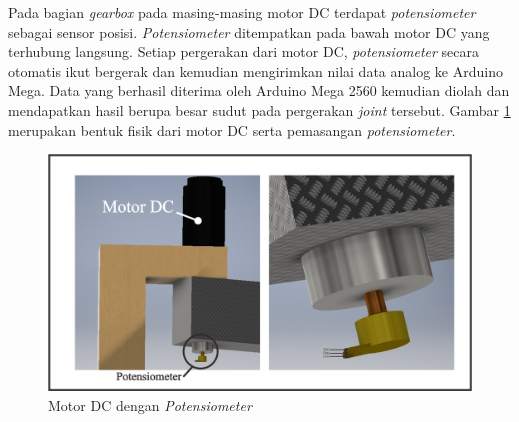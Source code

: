 	\begin{table}[H]
	\centering
	\caption{Spesifikasi Motor DC pada Robot SCARA}
	\label{tbl.spesifikasimotordc}
\end{table}
Pada bagian \textit{gearbox} pada masing-masing motor DC terdapat \textit{potensiometer} sebagai sensor posisi. \textit{Potensiometer} ditempatkan pada bawah motor DC yang terhubung langsung. Setiap pergerakan dari motor DC, \textit{potensiometer} secara otomatis ikut bergerak dan kemudian mengirimkan nilai data analog ke Arduino Mega. Data yang berhasil diterima oleh Arduino Mega 2560 kemudian diolah dan mendapatkan hasil berupa besar sudut pada pergerakan \textit{joint} tersebut. Gambar \ref{pic.potensiometer} merupakan bentuk fisik dari motor DC serta pemasangan \textit{potensiometer}.
\begin{figure}[H]
	\centering
	\includegraphics[width=12cm]{gambar/potsementara.jpg}
	\caption{Motor DC dengan \textit{Potensiometer}}
	\label{pic.potensiometer}
\end{figure}

